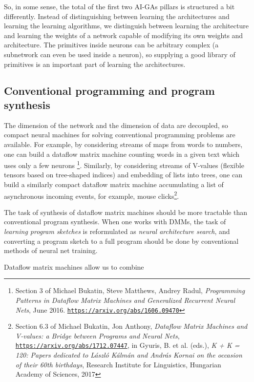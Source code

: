 \documentclass{article}
\begin{document}
So, in some sense, the total of the first two AI-GAs pillars is structured a bit differently. Instead of distinguishing
between learning the architectures and learning the learning algorithms, we distinguish between learning
the architecture and learning the weights of a network capable of modifying its own weights and architecture. The primitives inside neurons can be arbitrary complex (a subnetwork
can even be used inside a neuron), so supplying a good library of primitives is an important part of learning
the architectures.


\subsection{Conventional programming and program synthesis} The dimension of the network and the dimension
of data are decoupled, so compact neural machines for solving conventional programming problems are available.
For example, by considering streams of maps from words to numbers, one can build a dataflow matrix machine
counting words in a given text which uses only a few neurons \footnote{Section 3 of 
Michael Bukatin, Steve Matthews, Andrey Radul, {\em Programming Patterns 
in Dataflow Matrix Machines and Generalized Recurrent Neural Nets}, June 2016.
\href{https://arxiv.org/abs/1606.09470}{\tt https://arxiv.org/abs/1606.09470}}.
Similarly, by considering streams of V-values  (flexible tensors based on tree-shaped indices) and embedding
of lists into trees, one can build a similarly compact dataflow matrix machine
accumulating a list of asynchronous incoming events, for example, mouse clicks\footnote{Section 6.3 of Michael Bukatin, Jon Anthony, {\em Dataflow Matrix Machines and V-values: a Bridge between Programs and Neural Nets}, \href{https://arxiv.org/abs/1712.07447}{\tt https://arxiv.org/abs/1712.07447}, in Gyuris, B. et al. (eds.), {\em K + K = 120: Papers dedicated to L\'aszl\'o K\'alm\'an and Andr\'as Kornai on the occasion of their 60th birthdays}, Research Institute for Linguistics, Hungarian Academy of Sciences, 2017}. 

The task of synthesis of dataflow matrix machines
should be more tractable than conventional program synthesis. When one works with DMMs, the task of
{\em learning program sketches} is reformulated as {\em neural architecture search},
and converting a program sketch to a full program should be done by
conventional methods of neural net training. 

\vspace{0.1in}
\noindent
Dataflow matrix machines allow us  to combine
\end{document}
